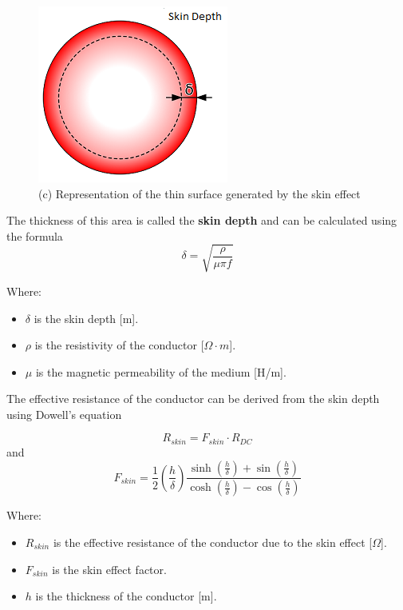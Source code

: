 \begin{itemize}
    \begin{figure}[th]
        \centering
        \includegraphics[scale=0.4]{Chapters/Chapter2/Flexible_PCB_coils/Figures/skin_depth.png} %
        \caption[Skin depth]{(c) Representation of the thin surface generated by the skin effect}
        \label{fig:Skin depth}
    \end{figure}

    The thickness of this area is called the \textbf{skin depth} and can be calculated using the formula
    \begin{equation}
        \delta = \sqrt{\frac{\rho}{\mu \pi f}}
    \end{equation}
            
    Where:
    \begin{itemize}
        \item \( \delta \) is the skin depth [m].
        \item \( \rho \) is the resistivity of the conductor [\(\Omega \cdot m\)].
        \item \( \mu \) is the magnetic permeability of the medium [H/m].
    \end{itemize}
    
    The effective resistance of the conductor can be derived from the skin depth using Dowell's equation

    \begin{equation}
        R_{skin} = F_{skin} \cdot R_{DC}
    \end{equation}
    and
    \begin{equation}
        F_{skin} = \frac{1}{2} (\frac{h}{\delta}) \frac{\sinh(\frac{h}{\delta}) + \sin(\frac{h}{\delta})}{\cosh(\frac{h}{\delta}) - \cos(\frac{h}{\delta})}
    \end{equation}

    Where:
    \begin{itemize}
        \item \( R_{skin} \) is the effective resistance of the conductor due to the skin effect [\(\Omega\)].
        \item \( F_{skin} \) is the skin effect factor.
        \item \( h \) is the thickness of the conductor [m].
    \end{itemize}


\end{itemize}
